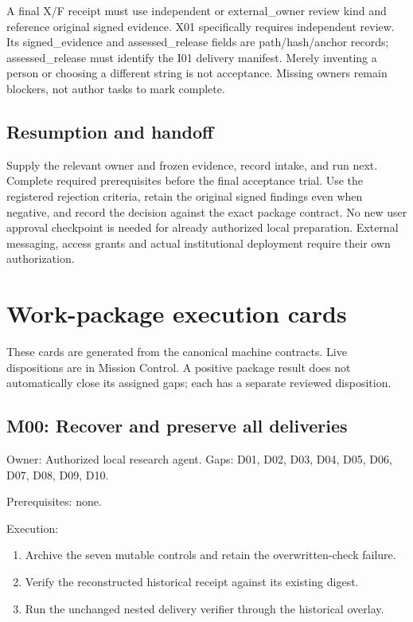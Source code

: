 \documentclass[
  11pt,
  a4paper,
]{article}
\providecommand{\tightlist}{%
  \setlength{\itemsep}{0pt}\setlength{\parskip}{0pt}}
\begin{document}
A final X/F receipt must use independent or external\_owner review kind
and reference original signed evidence. X01 specifically requires
independent review. Its signed\_evidence and assessed\_release fields
are path/hash/anchor records; assessed\_release must identify the I01
delivery manifest. Merely inventing a person or choosing a different
string is not acceptance. Missing owners remain blockers, not author
tasks to mark complete.

\hypertarget{resumption-and-handoff}{%
\subsection{Resumption and handoff}\label{resumption-and-handoff}}

Supply the relevant owner and frozen evidence, record intake, and run
next. Complete required prerequisites before the final acceptance trial.
Use the registered rejection criteria, retain the original signed
findings even when negative, and record the decision against the exact
package contract. No new user approval checkpoint is needed for already
authorized local preparation. External messaging, access grants and
actual institutional deployment require their own authorization.

\hypertarget{work-package-execution-cards}{%
\section{Work-package execution
cards}\label{work-package-execution-cards}}

These cards are generated from the canonical machine contracts. Live
dispositions are in Mission Control. A positive package result does not
automatically close its assigned gaps; each has a separate reviewed
disposition.

\hypertarget{m00-recover-and-preserve-all-deliveries}{%
\subsection{M00: Recover and preserve all
deliveries}\label{m00-recover-and-preserve-all-deliveries}}

Owner: Authorized local research agent. Gaps: D01, D02, D03, D04, D05,
D06, D07, D08, D09, D10.

Prerequisites: none.

Execution:

\begin{enumerate}
\def\labelenumi{\arabic{enumi}.}
\tightlist
\item
  Archive the seven mutable controls and retain the overwritten-check
  failure.
\item
  Verify the reconstructed historical receipt against its existing
  digest.
\item
  Run the unchanged nested delivery verifier through the historical
  overlay.
\end{enumerate}
\end{document}
